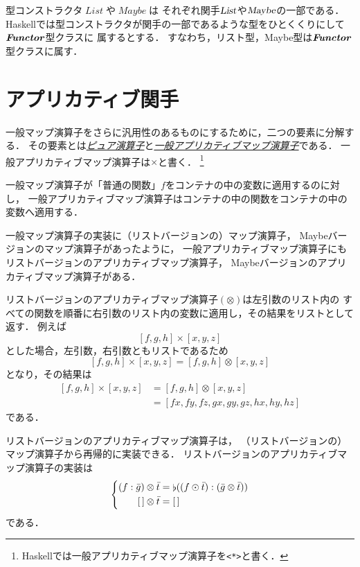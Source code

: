 \documentclass[a5paper,draft]{jsbook}
\newcommand{\programminglanguage}[1]{\textsf{#1}}
\newcommand{\haskell}{\programminglanguage{Haskell}}
\newcommand{\keyword}[1]{{\underline{\emph{#1}}}}
\newcommand{\code}[1]{\texttt{#1}}
\newcommand{\mathFunctor}[1]{\textsl{#1}} %
\newcommand{\mathTypeConstructor}[1]{\mathit{#1}} %
\newcommand{\mathTypeClass}[1]{\textbf{\emph{#1}}} %
\newcommand{\mathListVar}[1]{\Bar{#1}}
\newcommand{\mathListWith}[1]{\left[#1\right]}
\DeclareMathOperator{\mathList}{\mathTypeConstructor{List}}
\DeclareMathOperator{\mathMaybe}{\mathTypeConstructor{Maybe}}
\DeclareMathOperator{\mathListFunctor}{\mathFunctor{List}}
\DeclareMathOperator{\mathMaybeFunctor}{\mathFunctor{Maybe}}
\newcommand{\mathEmptyList}{{[\,]}}
\DeclareMathOperator{\mathConcat}{\flat}
\newcommand{\mathApplicativeGeneralMap}{\mathbin{\times}}
\newcommand{\mathApplicativeMap}{\mathbin{\otimes}}
\newcommand{\mathMap}{\mathbin{\odot}}
\begin{document}
型コンストラクタ$\mathList$や$\mathMaybe$は
それぞれ関手$\mathListFunctor$や$\mathMaybeFunctor$の一部である．
\haskell では型コンストラクタが関手の一部であるような型をひとくくりにして$\mathTypeClass{Functor}$型クラスに
属するとする．
すなわち，リスト型，Maybe型は$\mathTypeClass{Functor}$型クラスに属す．

\section{アプリカティブ関手}

一般マップ演算子をさらに汎用性のあるものにするために，二つの要素に分解する．
その要素とは\keyword{ピュア演算子}と\keyword{一般アプリカティブマップ演算子}である．
一般アプリカティブマップ演算子は$\mathApplicativeGeneralMap$と書く．%
\footnote{\haskell では一般アプリカティブマップ演算子を\code{<*>}と書く．}

一般マップ演算子が「普通の関数」$f$をコンテナの中の変数に適用するのに対し，
一般アプリカティブマップ演算子はコンテナの中の関数をコンテナの中の変数へ適用する．

一般マップ演算子の実装に（リストバージョンの）マップ演算子，
Maybeバージョンのマップ演算子があったように，
一般アプリカティブマップ演算子にもリストバージョンのアプリカティブマップ演算子，
Maybeバージョンのアプリカティブマップ演算子がある．

リストバージョンのアプリカティブマップ演算子$(\mathApplicativeMap)$は左引数のリスト内の
すべての関数を順番に右引数のリスト内の変数に適用し，その結果をリストとして返す．
例えば
$$
\mathListWith{f,g,h}\mathApplicativeGeneralMap\mathListWith{x,y,z}
$$
とした場合，左引数，右引数ともリストであるため
$$
\mathListWith{f,g,h}\mathApplicativeGeneralMap\mathListWith{x,y,z}
=\mathListWith{f,g,h}\mathApplicativeMap\mathListWith{x,y,z}
$$
となり，その結果は
\begin{align}
\mathListWith{f,g,h}\mathApplicativeGeneralMap\mathListWith{x,y,z}
&=\mathListWith{f,g,h}\mathApplicativeMap\mathListWith{x,y,z}\\
&=\mathListWith{fx,fy,fz,gx,gy,gz,hx,hy,hz}
\end{align}
である．

リストバージョンのアプリカティブマップ演算子は，
（リストバージョンの）マップ演算子から再帰的に実装できる．
リストバージョンのアプリカティブマップ演算子の実装は
\begin{equation}
\left\{
\begin{split}
(f:\mathListVar{g})\mathApplicativeMap\mathListVar{t}&=\mathConcat((f\mathMap\mathListVar{t}):(\mathListVar{g}\mathApplicativeMap\mathListVar{t}))\\
\mathEmptyList\mathApplicativeMap\mathListVar{t}&=\mathEmptyList
\end{split}
\right.
\end{equation}
である．
\end{document}
